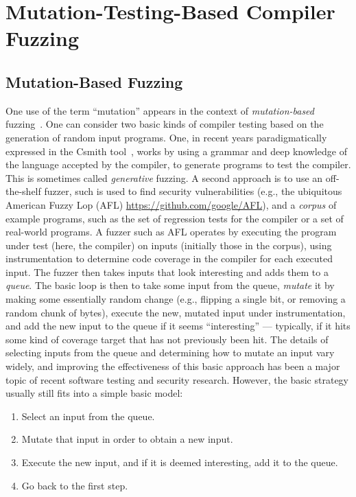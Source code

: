 \section{Mutation-Testing-Based Compiler Fuzzing}



\subsection{Mutation-Based Fuzzing}

One use of the term ``mutation'' appears in the context of \emph{mutation-based} fuzzing~\cite{ArtFuzz}.  One can consider two basic kinds of compiler testing based on the generation of random input programs.  One, in recent years paradigmatically expressed in the Csmith tool~\cite{csmith}, works by using a grammar and deep knowledge of the language accepted by the compiler, to generate programs to test the compiler.  This is sometimes called \emph{generative} fuzzing.  A second approach is to use an off-the-shelf fuzzer, such is used to find security vulnerabilities (e.g., the ubiquitous American Fuzzy Lop (AFL) \url{https://github.com/google/AFL}), and a \emph{corpus} of example programs, such as the set of regression tests for the compiler or a set of real-world programs.  A fuzzer such as AFL operates by executing the program under test (here, the compiler) on inputs (initially those in the corpus), using instrumentation to determine code coverage in the compiler for each executed input.  The fuzzer then takes inputs that look interesting and adds them to a \emph{queue}.  The basic loop is then to take some input from the queue, \emph{mutate} it by making some essentially random change (e.g., flipping a single bit, or removing a random chunk of bytes), execute the new, mutated input under instrumentation, and add the new input to the queue if it seems ``interesting'' --- typically, if it hits some kind of coverage target that has not previously been hit.  The details of selecting inputs from the queue and determining how to mutate an input vary widely, and improving the effectiveness of this basic approach has been a major topic of recent software testing and security research.  However, the basic strategy usually still fits into a simple basic model:

\begin{enumerate}
\item Select an input from the queue.
\item Mutate that input in order to obtain a new input.
\item Execute the new input, and if it is deemed interesting, add it to the queue.
\item Go back to the first step.
\end{enumerate}

